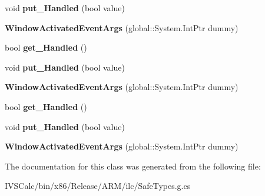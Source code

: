 \begin{DoxyCompactItemize}
void {\bfseries put\+\_\+\+Handled} (bool value)
\item 
\mbox{\label{class_windows_1_1_u_i_1_1_core_1_1_window_activated_event_args_a8fe24b3135f22741f9a23f52f8e0ae14}} 
{\bfseries Window\+Activated\+Event\+Args} (global\+::\+System.\+Int\+Ptr dummy)
\item 
\mbox{\label{class_windows_1_1_u_i_1_1_core_1_1_window_activated_event_args_a33f32bbcb0967f8b46db04ffa5a1cf9d}} 
bool {\bfseries get\+\_\+\+Handled} ()
\item 
\mbox{\label{class_windows_1_1_u_i_1_1_core_1_1_window_activated_event_args_a8a9b5417b4aa85225bea407fd08733b9}} 
void {\bfseries put\+\_\+\+Handled} (bool value)
\item 
\mbox{\label{class_windows_1_1_u_i_1_1_core_1_1_window_activated_event_args_a8fe24b3135f22741f9a23f52f8e0ae14}} 
{\bfseries Window\+Activated\+Event\+Args} (global\+::\+System.\+Int\+Ptr dummy)
\item 
\mbox{\label{class_windows_1_1_u_i_1_1_core_1_1_window_activated_event_args_a33f32bbcb0967f8b46db04ffa5a1cf9d}} 
bool {\bfseries get\+\_\+\+Handled} ()
\item 
\mbox{\label{class_windows_1_1_u_i_1_1_core_1_1_window_activated_event_args_a8a9b5417b4aa85225bea407fd08733b9}} 
void {\bfseries put\+\_\+\+Handled} (bool value)
\item 
\mbox{\label{class_windows_1_1_u_i_1_1_core_1_1_window_activated_event_args_a8fe24b3135f22741f9a23f52f8e0ae14}} 
{\bfseries Window\+Activated\+Event\+Args} (global\+::\+System.\+Int\+Ptr dummy)
\end{DoxyCompactItemize}


The documentation for this class was generated from the following file\+:\begin{DoxyCompactItemize}
\item 
I\+V\+S\+Calc/bin/x86/\+Release/\+A\+R\+M/ilc/Safe\+Types.\+g.\+cs\end{DoxyCompactItemize}
